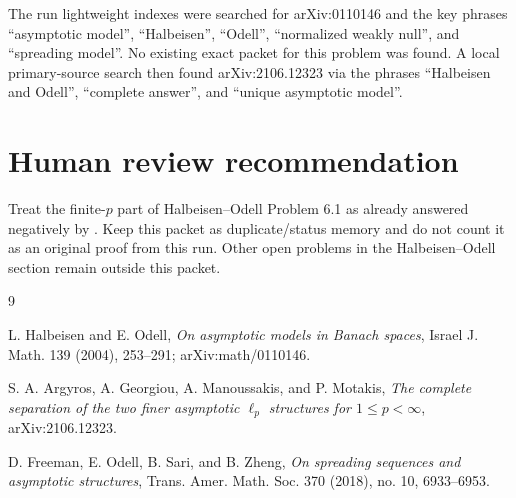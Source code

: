 \documentclass[11pt]{article}
\begin{document}
The run lightweight indexes were searched for arXiv:0110146 and the key
phrases ``asymptotic model'', ``Halbeisen'', ``Odell'', ``normalized weakly
null'', and ``spreading model''.  No existing exact packet for this problem was
found.  A local primary-source search then found arXiv:2106.12323 via the
phrases ``Halbeisen and Odell'', ``complete answer'', and ``unique asymptotic
model''.

\section*{Human review recommendation}

Treat the finite-\(p\) part of Halbeisen--Odell Problem 6.1 as already
answered negatively by \cite{AGMM}.  Keep this packet as duplicate/status
memory and do not count it as an original proof from this run.  Other open
problems in the Halbeisen--Odell section remain outside this packet.

\begin{thebibliography}{9}

L. Halbeisen and E. Odell,
\emph{On asymptotic models in Banach spaces},
Israel J. Math. 139 (2004), 253--291; arXiv:math/0110146.

S. A. Argyros, A. Georgiou, A. Manoussakis, and P. Motakis,
\emph{The complete separation of the two finer asymptotic \(\ell_p\)
structures for \(1\leq p<\infty\)},
arXiv:2106.12323.

D. Freeman, E. Odell, B. Sari, and B. Zheng,
\emph{On spreading sequences and asymptotic structures},
Trans. Amer. Math. Soc. 370 (2018), no. 10, 6933--6953.

\end{thebibliography}
\end{document}
